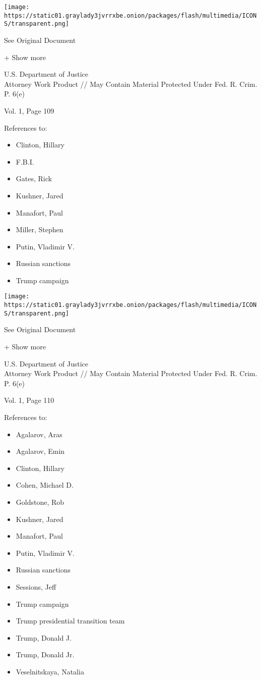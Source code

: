 \protect\hyperlink{}{}

\texttt{[image: https://static01.graylady3jvrrxbe.onion/packages/flash/multimedia/ICONS/transparent.png]}

See Original Document

+ Show more

U.S. Department of Justice\\
Attorney Work Product // May Contain Material Protected Under Fed. R.
Crim. P. 6(e)

Vol. 1, Page 109

References to:

\begin{itemize}
\tightlist
\item
  Clinton, Hillary
\item
  F.B.I.
\item
  Gates, Rick
\item
  Kushner, Jared
\item
  Manafort, Paul 
\item
  Miller, Stephen
\item
  Putin, Vladimir V.
\item
  Russian sanctions
\item
  Trump campaign
\end{itemize}

\protect\hyperlink{}{}

\texttt{[image: https://static01.graylady3jvrrxbe.onion/packages/flash/multimedia/ICONS/transparent.png]}

See Original Document

+ Show more

U.S. Department of Justice\\
Attorney Work Product // May Contain Material Protected Under Fed. R.
Crim. P. 6(e)

Vol. 1, Page 110

References to:

\begin{itemize}
\tightlist
\item
  Agalarov, Aras
\item
  Agalarov, Emin
\item
  Clinton, Hillary
\item
  Cohen, Michael D.
\item
  Goldstone, Rob
\item
  Kushner, Jared
\item
  Manafort, Paul 
\item
  Putin, Vladimir V.
\item
  Russian sanctions
\item
  Sessions, Jeff
\item
  Trump campaign
\item
  Trump presidential transition team
\item
  Trump, Donald J.
\item
  Trump, Donald Jr.
\item
  Veselnitskaya, Natalia
\end{itemize}

